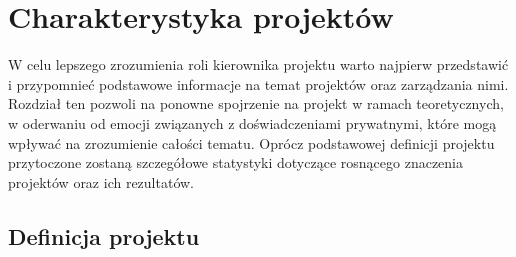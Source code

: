 \newpage %
\section{Charakterystyka projektów}
W celu lepszego zrozumienia roli kierownika projektu warto najpierw przedstawić i przypomnieć podstawowe informacje na temat projektów oraz zarządzania nimi. Rozdział ten pozwoli na ponowne spojrzenie na projekt w ramach teoretycznych, w oderwaniu od emocji związanych z doświadczeniami prywatnymi, które mogą wpływać na zrozumienie całości tematu. Oprócz podstawowej definicji projektu przytoczone zostaną szczegółowe statystyki dotyczące rosnącego znaczenia projektów oraz ich rezultatów.

\subsection{Definicja projektu}

